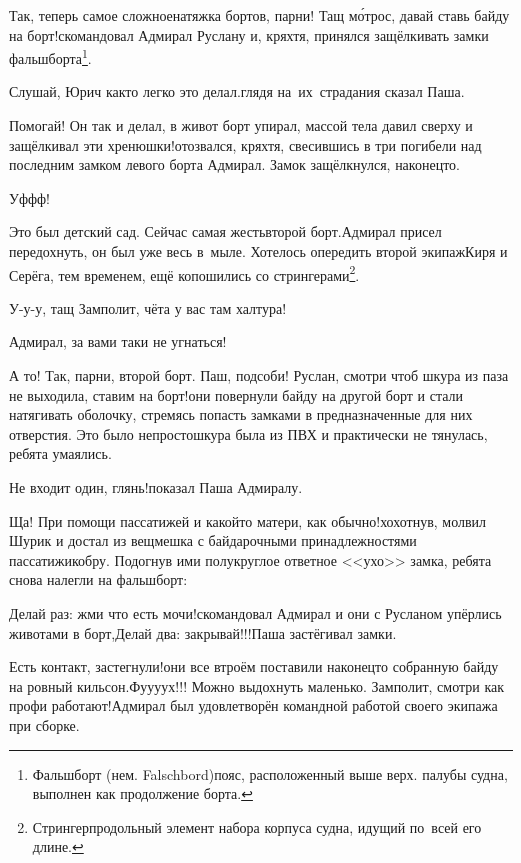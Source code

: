 \setcounter{footnote}{0}
\renewcommand*{\thefootnote}{\fnsymbol{footnote}}
\diagdash Так, теперь самое сложное\mdash натяжка бортов, парни! Тащ м\'{о}трос, давай ставь байду на борт!\mdash скомандовал Адмирал Руслану и, кряхтя, принялся защёлкивать замки фальшборта\footnote{Фальшборт (нем. Falschbord)\mdash пояс, расположенный выше верх. палубы судна, выполнен как продолжение борта\cite{МорскойСправочник}.}.

\diagdash Слушай, Юрич как\sdash то легко это делал.\mdash глядя на~их~страдания сказал Паша.

\diagdash Помогай! Он так и делал, в живот борт упирал, массой тела давил сверху и защёлкивал эти хренюшки!\mdash отозвался, кряхтя, свесившись в три погибели над последним замком левого борта Адмирал. Замок защёлкнулся, наконец\sdash то.

\diagdash Уф\sdash ф\sdash ф!

\setcounter{footnote}{0}
\diagdash Это был детский сад. Сейчас самая жесть\mdash второй борт.\mdash Адмирал присел передохнуть, он был уже весь в~мыле. Хотелось опередить второй экипаж\mdash Киря и Серёга, тем временем, ещё копошились со стрингерами\footnote{Стрингер\mdash продольный элемент набора корпуса судна, идущий по~всей его длине\cite{МорскойСправочник}.}. 

\diagdash У-у-у, тащ Замполит, чёта у вас там халтура!

\diagdash Адмирал, за вами таки не угнаться!

\diagdash А то! Так, парни, второй борт. Паш, подсоби! Руслан, смотри чтоб шкура из паза не выходила, ставим на борт!\mdash они повернули байду на другой борт и стали натягивать оболочку, стремясь попасть замками в предназначенные для них отверстия. Это было непросто\mdash шкура была из ПВХ и практически не тянулась, ребята умаялись.

\diagdash Не входит один, глянь!\mdash показал Паша Адмиралу.

\diagdash Ща! При помощи пассатижей и какой\sdash то матери, как обычно!\mdash хохотнув, молвил Шурик и достал из вещмешка с байдарочными принадлежностями пассатижи\sdash кобру. Подогнув ими полукруглое ответное <<ухо>> замка, ребята снова налегли на фальшборт:

\diagdash Делай раз: жми что есть мочи!\mdash скомандовал Адмирал и они с Русланом упёрлись животами в борт,\mdash Делай два: закрывай!!!\mdash Паша застёгивал замки.

\diagdash Есть контакт, застегнули!\mdash они все втроём поставили наконец\sdash то собранную байду на ровный кильсон.\mdash Фу\sdash у\sdash у\sdash ух!!! Можно выдохнуть маленько. Замполит, смотри как профи работают!\mdash Адмирал был удовлетворён командной работой своего экипажа при сборке.

